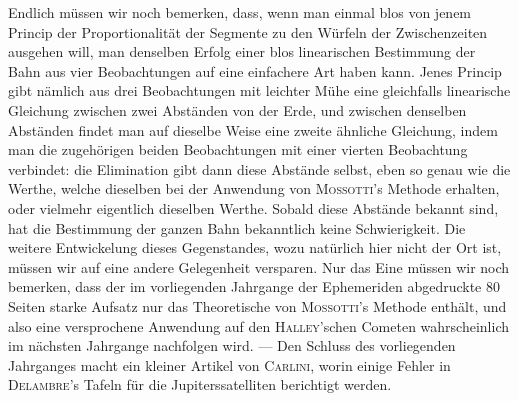 Endlich müssen wir noch bemerken, dass, wenn man einmal blos von jenem Princip der Proportionalität der Segmente zu den Würfeln der Zwischenzeiten ausgehen will, man denselben Erfolg einer blos linearischen Bestimmung der Bahn aus vier Beobachtungen auf eine einfachere Art haben kann. Jenes Princip gibt nämlich aus drei Beobachtungen mit leichter Mühe eine gleichfalls linearische Gleichung zwischen zwei Abständen von der Erde, und zwischen denselben Abständen findet man auf dieselbe Weise eine zweite ähnliche Gleichung, indem man die zugehörigen beiden Beobachtungen mit einer vierten Beobachtung verbindet: die Elimination gibt dann diese Abstände selbst, eben so genau wie die Werthe, welche dieselben bei der Anwendung von \textsc{Mossotti}'s Methode erhalten, oder vielmehr eigentlich dieselben Werthe. Sobald diese Abstände bekannt sind, hat die Bestimmung der ganzen Bahn bekanntlich keine Schwierigkeit. Die weitere Entwickelung dieses Gegenstandes, wozu natürlich hier nicht der Ort ist, müssen wir auf eine andere Gelegenheit versparen. Nur das Eine müssen wir noch bemerken, dass der im vorliegenden Jahrgange der Ephemeriden abgedruckte 80 Seiten starke Aufsatz nur das Theoretische von \textsc{Mossotti}'s Methode enthält, und also eine versprochene Anwendung auf den \textsc{Halley}'schen Cometen wahrscheinlich im nächsten Jahrgange nachfolgen wird. --- Den Schluss des vorliegenden Jahrganges macht ein kleiner Artikel von \textsc{Carlini}, worin einige Fehler in \textsc{Delambre}'s Tafeln für die Jupiterssatelliten berichtigt werden.
